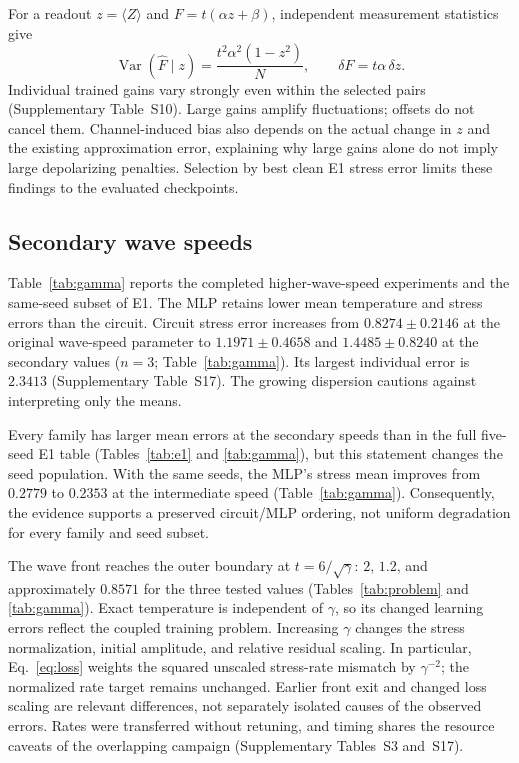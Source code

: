\documentclass[11pt]{article}
\DeclareMathOperator{\Var}{Var}
\begin{document}
For a readout $z=\langle Z\rangle$ and $F=t(\alpha z+\beta)$,
independent measurement statistics give
\begin{equation}
 \Var(\widehat F\mid z)=\frac{t^2\alpha^2(1-z^2)}N,
 \qquad \delta F=t\alpha\,\delta z.
 \label{eq:amplification}
\end{equation}
Individual trained gains vary strongly even within the selected pairs
(Supplementary Table~S10). Large gains amplify fluctuations; offsets do
not cancel them. Channel-induced bias also depends on the actual change
in $z$ and the existing approximation error, explaining why large gains
alone do not imply large depolarizing penalties. Selection by best clean
E1 stress error limits these findings to the evaluated checkpoints.

\subsection{Secondary wave speeds}
\label{sec:secondary}

Table~\ref{tab:gamma} reports the completed higher-wave-speed experiments
and the same-seed subset of E1. The MLP retains lower mean temperature
and stress errors than the circuit. Circuit stress error increases from
$0.8274\pm0.2146$ at the original wave-speed parameter to
$1.1971\pm0.4658$ and $1.4485\pm0.8240$ at the secondary values
($n=3$; Table~\ref{tab:gamma}). Its largest individual error is $2.3413$
(Supplementary Table~S17). The growing dispersion cautions against
interpreting only the means.

Every family has larger mean errors at the secondary speeds than in the
full five-seed E1 table (Tables~\ref{tab:e1} and \ref{tab:gamma}), but this
statement changes the seed population.
With the same seeds, the MLP's stress mean improves from $0.2779$ to
$0.2353$ at the intermediate speed (Table~\ref{tab:gamma}).
Consequently, the evidence supports a preserved circuit/MLP ordering,
not uniform degradation for every family and seed subset.

The wave front reaches the outer boundary at $t=6/\sqrt\gamma$:
$2$, $1.2$, and approximately $0.8571$ for the three tested values
(Tables~\ref{tab:problem} and \ref{tab:gamma}). Exact temperature is
independent of $\gamma$, so its changed learning errors reflect the coupled
training problem. Increasing $\gamma$ changes the stress normalization,
initial amplitude, and relative residual scaling. In particular,
Eq.~\eqref{eq:loss} weights the squared unscaled stress-rate mismatch by
$\gamma^{-2}$; the normalized rate target remains unchanged.
Earlier front exit and changed loss scaling are relevant differences,
not separately isolated causes of the observed errors. Rates were
transferred without retuning, and timing shares the resource caveats
of the overlapping campaign (Supplementary Tables~S3 and~S17).
\end{document}
